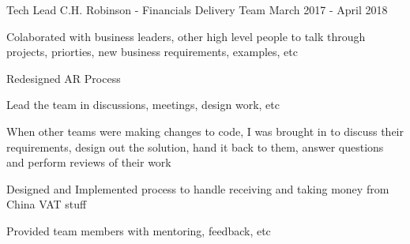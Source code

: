 \begin{cventries}
  \cventry
    {Tech Lead} %
    {C.H. Robinson  - Financials Delivery Team} %
    {} %
    {March 2017 - April 2018} %
    {
      \begin{cvitems} %
      	\item {Colaborated with business leaders, other high level people to talk through projects, priorties, new business requirements, examples, etc }
        \item {Redesigned AR Process}
        \item {Lead the team in discussions, meetings, design work, etc}
        \item {When other teams were making changes to code, I was brought in to discuss their requirements, design out the solution, hand it back to them, answer questions and perform reviews of their work}
        \item {Designed and Implemented process to handle receiving and taking money from China VAT stuff}
        \item {Provided team members with mentoring, feedback, etc}
      \end{cvitems}
    }


\end{cventries}

